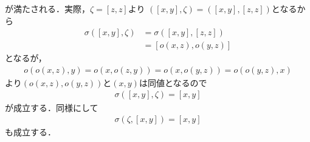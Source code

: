 	が満たされる．実際，$\zeta = [z,z]$より
	$\left( [x,y],\zeta \right) = \left( [x,y],[z,z] \right)$となるから
	\begin{align}
		\sigma \left( [x,y],\zeta \right)
		&= \sigma \left( [x,y],[z,z] \right) \\
		&= \left[ o(x,z), o(y,z) \right]
	\end{align}
	となるが，
	\begin{align}
		o(o(x,z),y) = o(x,o(z,y)) = o(x,o(y,z)) = o(o(y,z),x)
	\end{align}
	より$(o(x,z),o(y,z))$と$(x,y)$は同値となるので
	\begin{align}
		\sigma \left( [x,y],\zeta \right) = [x,y]
	\end{align}
	が成立する．同様にして
	\begin{align}
		\sigma \left( \zeta,[x,y] \right) = [x,y]
	\end{align}
	も成立する．
\newpage